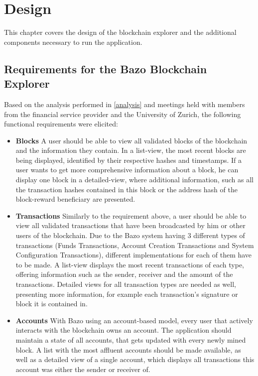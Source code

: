 \chapter{Design} \label{chap:design}
This chapter covers the design of the blockchain explorer and the additional components necessary to run the application.

\section{Requirements for the Bazo Blockchain Explorer}
Based on the analysis performed in \ref{analysis} and meetings held with members from the financial service provider and the University of Zurich, the following functional requirements were elicited:
\begin{itemize}
\item \textbf{Blocks}
A user should be able to view all validated blocks of the blockchain and the information they contain. In a list-view, the most recent blocks are being displayed, identified by their respective hashes and timestamps. If a user wants to get more comprehensive information about a block, he can display one block in a detailed-view, where additional information, such as all the transaction hashes contained in this block or the address hash of the block-reward beneficiary are presented.
\item \textbf{Transactions}
Similarly to the requirement above, a user should be able to view all validated transactions that have been broadcasted by him or other users of the blockchain. Due to the Bazo system having 3 different types of transactions (Funds Transactions, Account Creation Transactions and System Configuration Transactions), different implementations for each of them have to be made. A list-view displays the most recent transactions of each type, offering information such as the sender, receiver and the amount of the transactions. Detailed views for all transaction types are needed as well, presenting more information, for example each transaction's signature or block it is contained in.
\item \textbf{Accounts}
With Bazo using an account-based model, every user that actively interacts with the blockchain owns an account. The application should maintain a state of all accounts, that gets updated with every newly mined block. A list with the most affluent accounts should be made available, as well as a detailed view of a single account, which displays all transactions this account was either the sender or receiver of.

\end{itemize}
